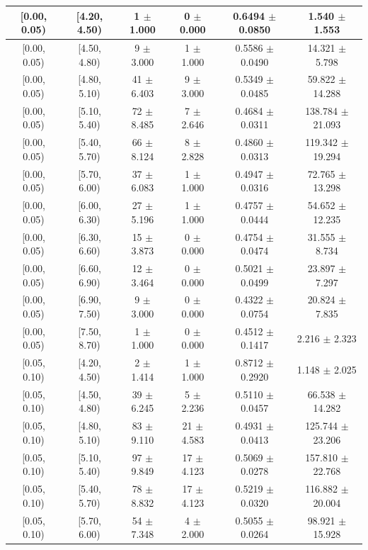 \begin{longtable}{|c|c|c|c|c|c|}
\hline
\endlastfoot
[0.00, 0.05) & [4.20, 4.50) & 1 $\pm$ 1.000 & 0 $\pm$ 0.000 & 0.6494 $\pm$ 0.0850 & 1.540 $\pm$ 1.553 \\ 
\hline
[0.00, 0.05) & [4.50, 4.80) & 9 $\pm$ 3.000 & 1 $\pm$ 1.000 & 0.5586 $\pm$ 0.0490 & 14.321 $\pm$ 5.798 \\ 
\hline
[0.00, 0.05) & [4.80, 5.10) & 41 $\pm$ 6.403 & 9 $\pm$ 3.000 & 0.5349 $\pm$ 0.0485 & 59.822 $\pm$ 14.288 \\ 
\hline
[0.00, 0.05) & [5.10, 5.40) & 72 $\pm$ 8.485 & 7 $\pm$ 2.646 & 0.4684 $\pm$ 0.0311 & 138.784 $\pm$ 21.093 \\ 
\hline
[0.00, 0.05) & [5.40, 5.70) & 66 $\pm$ 8.124 & 8 $\pm$ 2.828 & 0.4860 $\pm$ 0.0313 & 119.342 $\pm$ 19.294 \\ 
\hline
[0.00, 0.05) & [5.70, 6.00) & 37 $\pm$ 6.083 & 1 $\pm$ 1.000 & 0.4947 $\pm$ 0.0316 & 72.765 $\pm$ 13.298 \\ 
\hline
[0.00, 0.05) & [6.00, 6.30) & 27 $\pm$ 5.196 & 1 $\pm$ 1.000 & 0.4757 $\pm$ 0.0444 & 54.652 $\pm$ 12.235 \\ 
\hline
[0.00, 0.05) & [6.30, 6.60) & 15 $\pm$ 3.873 & 0 $\pm$ 0.000 & 0.4754 $\pm$ 0.0474 & 31.555 $\pm$ 8.734 \\ 
\hline
[0.00, 0.05) & [6.60, 6.90) & 12 $\pm$ 3.464 & 0 $\pm$ 0.000 & 0.5021 $\pm$ 0.0499 & 23.897 $\pm$ 7.297 \\ 
\hline
[0.00, 0.05) & [6.90, 7.50) & 9 $\pm$ 3.000 & 0 $\pm$ 0.000 & 0.4322 $\pm$ 0.0754 & 20.824 $\pm$ 7.835 \\ 
\hline
[0.00, 0.05) & [7.50, 8.70) & 1 $\pm$ 1.000 & 0 $\pm$ 0.000 & 0.4512 $\pm$ 0.1417 & 2.216 $\pm$ 2.323 \\ 
\hline
[0.05, 0.10) & [4.20, 4.50) & 2 $\pm$ 1.414 & 1 $\pm$ 1.000 & 0.8712 $\pm$ 0.2920 & 1.148 $\pm$ 2.025 \\ 
\hline
[0.05, 0.10) & [4.50, 4.80) & 39 $\pm$ 6.245 & 5 $\pm$ 2.236 & 0.5110 $\pm$ 0.0457 & 66.538 $\pm$ 14.282 \\ 
\hline
[0.05, 0.10) & [4.80, 5.10) & 83 $\pm$ 9.110 & 21 $\pm$ 4.583 & 0.4931 $\pm$ 0.0413 & 125.744 $\pm$ 23.206 \\ 
\hline
[0.05, 0.10) & [5.10, 5.40) & 97 $\pm$ 9.849 & 17 $\pm$ 4.123 & 0.5069 $\pm$ 0.0278 & 157.810 $\pm$ 22.768 \\ 
\hline
[0.05, 0.10) & [5.40, 5.70) & 78 $\pm$ 8.832 & 17 $\pm$ 4.123 & 0.5219 $\pm$ 0.0320 & 116.882 $\pm$ 20.004 \\ 
\hline
[0.05, 0.10) & [5.70, 6.00) & 54 $\pm$ 7.348 & 4 $\pm$ 2.000 & 0.5055 $\pm$ 0.0264 & 98.921 $\pm$ 15.928 \\ 

\end{longtable}
